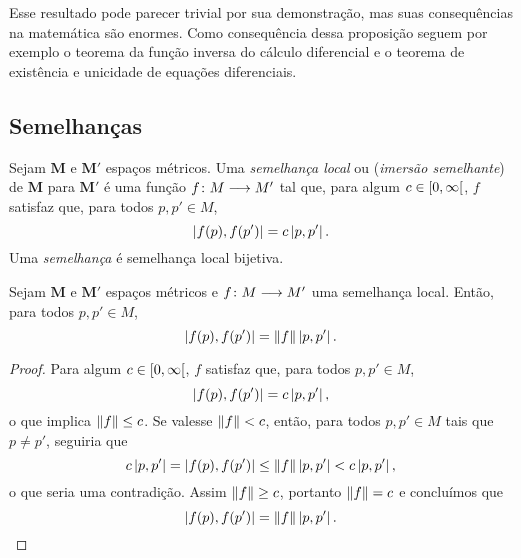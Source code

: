 Esse resultado pode parecer trivial por sua demonstração, mas suas consequências na matemática são enormes. Como consequência dessa proposição seguem por exemplo o teorema da função inversa do cálculo diferencial e o teorema de existência e unicidade de equações diferenciais.









\subsection{Semelhanças}

\begin{definition}
Sejam $\bm{M}$ e $\bm{M'}$ espaços métricos. Uma \emph{semelhança local} ou (\emph{imersão semelhante}) de $\bm{M}$ para $\bm{M'}$ é uma função ${f}\colon {M} \longrightarrow {M'}$ tal que, para algum $c \in \left[{0},{\infty}\right[$, $f$ satisfaz que, para todos $p,p' \in M$,
	\begin{equation*}
	\left\vert{f(p)},{f(p')}\right\vert = c \left\vert{p},{p'}\right\vert.
	\end{equation*}
Uma \emph{semelhança} é semelhança local bijetiva.
\end{definition}

\begin{proposition}
Sejam $\bm{M}$ e $\bm{M'}$ espaços métricos e ${f}\colon {M} \longrightarrow {M'}$ uma semelhança local. Então, para todos $p,p' \in M$,
	\begin{equation*}
	\left\vert{f(p)},{f(p')}\right\vert = \left\Vert{f}\right\Vert \left\vert{p},{p'}\right\vert.
	\end{equation*}
\end{proposition}
\begin{proof}
Para algum $c \in \left[{0},{\infty}\right[$, $f$ satisfaz que, para todos $p,p' \in M$,
	\begin{equation*}
	\left\vert{f(p)},{f(p')}\right\vert = c \left\vert{p},{p'}\right\vert,
	\end{equation*}
o que implica $\left\Vert{f}\right\Vert \leq c$. Se valesse $\left\Vert{f}\right\Vert<c$, então, para todos $p,p' \in M$ tais que $p \neq p'$, seguiria que
	\begin{equation*}
	c \left\vert{p},{p'}\right\vert = \left\vert{f(p)},{f(p')}\right\vert \leq \left\Vert{f}\right\Vert\left\vert{p},{p'}\right\vert < c \left\vert{p},{p'}\right\vert,
	\end{equation*}
o que seria uma contradição. Assim $\left\Vert{f}\right\Vert \geq c$, portanto $\left\Vert{f}\right\Vert=c$ e concluímos que
	\begin{equation*}
	\left\vert{f(p)},{f(p')}\right\vert = \left\Vert{f}\right\Vert \left\vert{p},{p'}\right\vert.
	\qedhere
	\end{equation*}
\end{proof}


